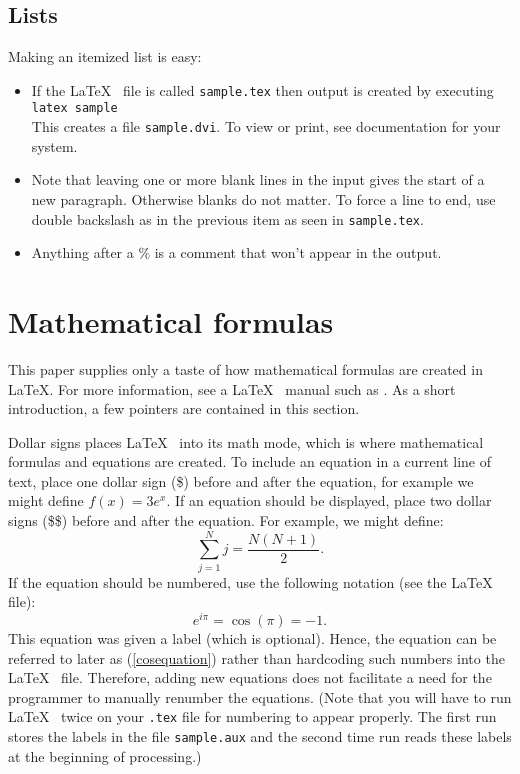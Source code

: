 	\subsection{Lists}
	Making an itemized list is easy:
	\begin{itemize}
		\item If the \LaTeX~ file is called {\tt sample.tex} then output is created by
		executing \\
		{\tt latex sample} \\
		This creates a file {\tt sample.dvi}.
		To view or print, see documentation for your system.
		\item Note that leaving one or more blank lines
		in the input
		gives the start of a new paragraph.  Otherwise blanks
		do not   matter.  %
		To force a line to end, use double backslash as in the previous item as seen in {\tt sample.tex}.
		
		\item Anything after a \% is a comment that won't appear in the output.
	\end{itemize}
	
	\section{Mathematical formulas}
	
	This paper supplies only a taste of how mathematical formulas are created in \LaTeX.  
	For more information, see a \LaTeX~ manual such as \cite{go-mi-sa:latex}.  
	As a short introduction, a few pointers are contained in this section. 
	
	Dollar signs places \LaTeX~ into its math mode, which is where mathematical formulas and equations
	are created.  To include an equation in a current line of text, place one dollar sign (\$) before 
	and after the equation, for example we might define $f(x) = 3e^x$.   If an equation should be displayed,
	place two dollar signs (\$\$) before and after the equation.  For example, we might define:
	$$
	\sum_{j=1}^N j = \frac{N(N+1)}{2}.
	$$
	If the equation should be numbered, use the following notation (see the \LaTeX~ file):
	\begin{equation}  
		e^{i\pi} = \cos(\pi) = -1.
		\label{cosequation}
	\end{equation}
	This equation was given a label (which is optional).  Hence, the equation
	can be referred to later as (\ref{cosequation}) rather than hardcoding such numbers into
	the \LaTeX~ file.  Therefore, adding new equations does not facilitate a need for the programmer 
	to manually renumber the equations. 
	(Note that you will have to run \LaTeX~ twice on your {\tt .tex}
	file for numbering to appear properly.  The first run stores the labels in
	the file {\tt sample.aux} and the second time run reads these labels at the
	beginning of processing.)
	
